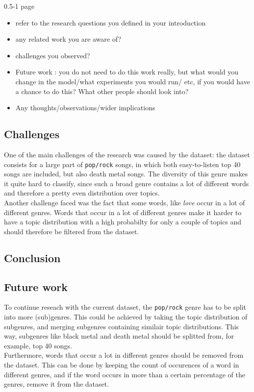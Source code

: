 0.5-1 page
\begin{itemize}
\item refer to the research questions you defined in your introduction
\item any related work you are aware of?
\item challenges you observed?
\item Future work : you do not need to do this work really, but what would you change in the model/what experiments you would run/ etc, if you would have a chance to do this? What other people should look into?
\item Any thoughts/observations/wider implications
\end{itemize}

\subsection{Challenges}
One of the main challenges of the research was caused by the dataset: the dataset consists for a large part of \verb|pop/rock| songs, in which both easy-to-listen top 40 songs are included, but also death metal songs. The diversity of this genre makes it quite hard to classify, since such a broad genre contains a lot of different words and therefore a pretty even distribution over topics. \\
Another challenge faced was the fact that some words, like \textit{love} occur in a lot of different genres. Words that occur in a lot of different genres make it harder to have a topic distribution with a high probabilty for only a couple of topics and should therefore be filtered from the dataset. 

\subsection{Conclusion}

\subsection{Future work}
To continue reseach with the current dataset, the \verb|pop/rock| genre has to be split into more (sub)genres. This could be achieved by taking the topic distribution of subgenres, and merging subgenres containing similair topic distributions. This way, subgenres like black metal and death metal should be splitted from, for example, top 40 songs. \\
Furthermore, words that occur a lot in different genres should be removed from the dataset. This can be done by keeping the count of occurences of a word in different genres, and if the word occurs in more than a certain percentage of the genres, remove it from the dataset.